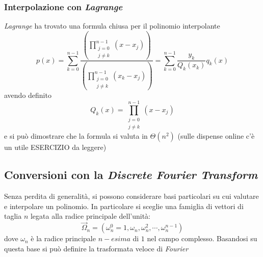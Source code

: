 \subsubsection{Interpolazione con \textit{Lagrange}}
\textit{Lagrange} ha trovato una formula chiusa per il polinomio interpolante
\begin{equation*}
    p(x) = \sum_{k=0}^{n-1} \frac{\left(
            \displaystyle
            \prod_{\substack{j=0 \\ j \neq k}}^{n-1} \left( x - x_j \right)
    \right)}{\left( 
            \displaystyle
            \prod_{\substack{j=0 \\ j \neq k}}^{n-1} \left( x_k - x_j \right)
    \right)}
    = \sum_{k=0}^{n-1} \frac{y_k}{Q_k(x_k)} q_k(x)
\end{equation*}
avendo definito
\begin{equation*}
    Q_k(x) = \prod_{\substack{j=0 \\ j \neq k}}^{n-1} \left( x - x_j \right)
\end{equation*}
e si può dimostrare che la formula si valuta in $\Theta \left( n^2 \right)$ (sulle dispense online c'è un utile ESERCIZIO da leggere)

\subsection{Conversioni con la \textit{Discrete Fourier Transform}}
Senza perdita di generalità, si possono considerare basi particolari su cui valutare e interpolare un polinomio. In particolare si sceglie una famiglia di vettori di taglia $n$ legata alla radice principale dell'unità:
\begin{equation*}
    \vec{\Omega}_n = 
    \left(
        \omega_n^0=1 , \omega_n, \omega_n^2, \cdots, \omega_n^{n-1} 
    \right)
\end{equation*}
dove $\omega_n$ è la radice principale $n-esima$ di $1$ nel campo complesso.
Basandosi su questa base si può definire la trasformata veloce di \textit{Fourier}

